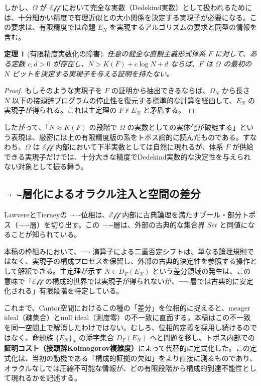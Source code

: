 \documentclass[a4paper,11pt]{ltjsarticle}
\theoremstyle{plain}
\newtheorem{theorem}{定理}
\begin{document}
しかし、$\Omega$ が $\mathcal{Eff}$ において完全な実数（Dedekind実数）として扱われるためには、十分細かい精度で有理近似との大小関係を決定する実現子が必要になる。この要求は、有限精度では命題 $E_N$ を実現するアルゴリズムの要求と同型の情報を含む。

\begin{theorem}[有限精度実数化の障害]
任意の健全な直観主義形式体系 $F$ に対して、ある定数 $c,d>0$ が存在し、$N>K(F)+c\log N+d$ ならば、$F$ は $\Omega$ の最初の $N$ ビットを決定する実現子を与える証明を持たない。
\end{theorem}

\begin{proof}
もしそのような実現子を $F$ の証明から抽出できるならば、$\Omega_N$ から長さ $N$ 以下の接頭辞プログラムの停止性を復元する標準的な計算を経由して、$E_N$ の実現子が得られる。これは主定理の $F \nvdash E_N$ と矛盾する。
\end{proof}

したがって、「$N \approx K(F)$ の段階で $\Omega$ の実数としての実体化が破綻する」という表現は、厳密には上の有限精度版の系をトポス論的に読んだものである。すなわち、$\Omega$ は $\mathcal{Eff}$ 内部において下半実数としては自然に現れるが、体系 $F$ が供給できる実現子だけでは、十分大きな精度でDedekind実数的な決定性を与えられない対象として振る舞う。

\subsection{$\neg\neg$-層化によるオラクル注入と空間の差分}

LawvereとTierneyの $\neg\neg$-位相は、$\mathcal{Eff}$ 内部に古典論理を満たすブール・部分トポス（$\neg\neg$-層）を切り出す。この $\neg\neg$-層は、外部の古典的な集合界 $Set$ と同値になることが知られている。

本稿の枠組みにおいて、$\neg\neg$ 演算子による二重否定シフトは、単なる論理規則ではなく、実現子の構成プロセスを保留し、外部の古典的決定性を参照する操作として解釈できる。主定理が示す $N \in D_F(E_N)$ という差分領域の発生は、この意味で「$\mathcal{Eff}$ の構成的世界では実現子が得られないが、$\neg\neg$-層では古典的に安定化される」有限段階を特定している。

これまで、Cantor空間におけるこの種の「差分」を位相的に捉えると、meager ideal（疎集合）とnull ideal（測度零）の不一致に直面する。本稿はこの不一致を同一空間上で解消したわけではない。むしろ、位相的定義を採用し続けるのではなく、命題族 $\{E_N\}_N$ の添字集合 $D_F(E_N)$ へと問題を移し、トポス内部での\textbf{証明コスト（接頭辞Kolmogorov複雑度）}によって代替的に定式化した。この定式化は、当初の動機である「構成的証拠の欠如」をより直接に測るものであり、オラクルなしでは圧縮不可能な情報が、どの有限段階から構成的到達不能性として現れるかを記述する。
\end{document}
